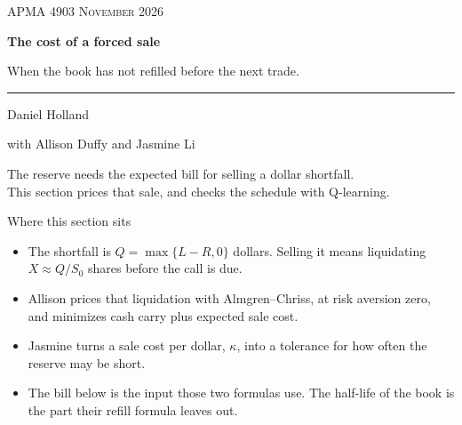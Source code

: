 \documentclass[aspectratio=169,10pt]{beamer}
\newcommand{\currentsource}{}
\newcommand{\framesource}[1]{\gdef\currentsource{#1}}
\begin{document}
\begin{frame}[plain]
\vspace{1.1em}
{\small\scshape\color{rust}APMA 4903  November 2026}\par\vspace{0.45em}
{\LARGE\bfseries\color{navy}The cost of a forced sale}\par\vspace{0.35em}
{\large\color{navy}When the book has not refilled before the next trade.}\par
\vspace{0.9em}
{\color{rust}\rule{3.2cm}{1.1pt}}\par\vspace{0.7em}
Daniel Holland\par
{\small\color{muted}with Allison Duffy and Jasmine Li}\par
\vspace{1.1em}
{\small The reserve needs the expected bill for selling a dollar shortfall.\\
This section prices that sale, and checks the schedule with Q-learning.}
\end{frame}

\begin{frame}{Where this section sits}
\framesource{Allison Duffy and Jasmine Li; Almgren and Chriss, 2001}
\begin{itemize}
\item The shortfall is \(Q=\max\{L-R,0\}\) dollars. Selling it means liquidating \(X\approx Q/S_0\) shares before the call is due.
\item Allison prices that liquidation with Almgren--Chriss, at risk aversion zero, and minimizes cash carry plus expected sale cost.
\item Jasmine turns a sale cost per dollar, \(\kappa\), into a tolerance for how often the reserve may be short.
\item The bill below is the input those two formulas use. The half-life of the book is the part their refill formula leaves out.
\end{itemize}
\end{frame}
\end{document}

